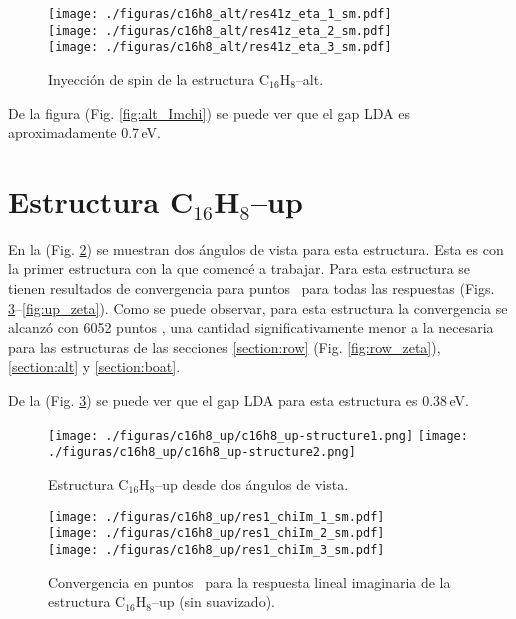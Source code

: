 \documentclass[11pt]{article}
\begin{document}
\begin{figure}[]
	\begin{center}
		\texttt{[image: ./figuras/c16h8\_alt/res41z\_eta\_1\_sm.pdf]}\\
		\texttt{[image: ./figuras/c16h8\_alt/res41z\_eta\_2\_sm.pdf]}\\
		\texttt{[image: ./figuras/c16h8\_alt/res41z\_eta\_3\_sm.pdf]}
	\end{center}
	\caption{Inyecci\'on de spin  de la estructura C$_{16}$H$_{8}$--alt.}
	\label{fig:alt_zeta}
\end{figure}



De la figura (Fig. \ref{fig:alt_Imchi}) se puede ver que el gap LDA es aproximadamente 0.7\,eV.


\newpage

\section{Estructura C$_{16}$H$_{8}$--up}\label{section:up}

En la (Fig. \ref{fig:up_struct}) se muestran dos \'angulos de vista para esta estructura. Esta es con la primer estructura con la que comenc\'e a trabajar. Para esta estructura se tienen resultados de convergencia para puntos \vk \ para todas las respuestas (Figs. \ref{fig:up_Imchi}--\ref{fig:up_zeta}). Como se puede observar, para esta estructura la convergencia se alcanz\'o con 6052 puntos \vk, una cantidad significativamente menor a la necesaria para las estructuras de las secciones \ref{section:row} (Fig. \ref{fig:row_zeta}), \ref{section:alt} y \ref{section:boat}.

De la (Fig. \ref{fig:up_Imchi}) se puede ver que el gap LDA para esta estructura es 0.38\,eV. 

\begin{figure}[h!]
	\begin{center}
		\texttt{[image: ./figuras/c16h8\_up/c16h8\_up-structure1.png]}
		\texttt{[image: ./figuras/c16h8\_up/c16h8\_up-structure2.png]}
	\end{center}
	\caption{Estructura C$_{16}$H$_{8}$--up desde dos \'angulos de vista.}
	\label{fig:up_struct}
\end{figure}


\begin{figure}[]
	\begin{center}
		\texttt{[image: ./figuras/c16h8\_up/res1\_chiIm\_1\_sm.pdf]}\\
		\texttt{[image: ./figuras/c16h8\_up/res1\_chiIm\_2\_sm.pdf]}\\
		\texttt{[image: ./figuras/c16h8\_up/res1\_chiIm\_3\_sm.pdf]}
	\end{center}
	\caption{Convergencia  en puntos \vk \ para la respuesta lineal imaginaria  de la estructura C$_{16}$H$_{8}$--up (sin suavizado).}
	\label{fig:up_Imchi}
\end{figure}
\end{document}
